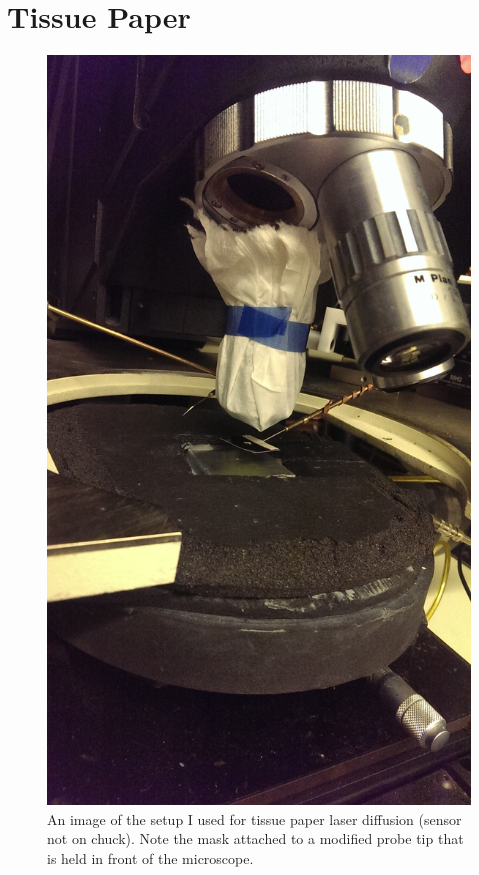 \documentclass{report}
\begin{document}
        \section{Tissue Paper}
            \begin{figure}[h] 
                \includegraphics[height=.7\textheight]{tissue}
                \centering
                \caption{ An image of the setup I used for tissue paper laser diffusion (sensor not on chuck). Note the mask attached to a modified probe tip that is held in front of the microscope. }
                \label{fig:tissue}
            \end{figure}
\end{document}
